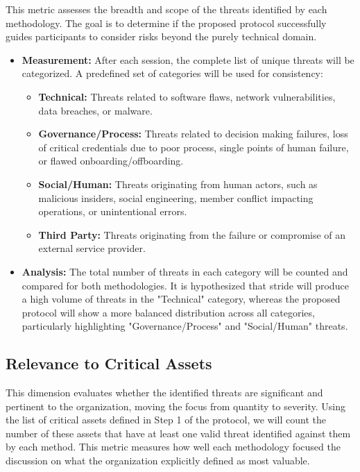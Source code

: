This metric assesses the breadth and scope of the threats identified by each
methodology. The goal is to determine if the proposed protocol successfully
guides participants to consider risks beyond the purely technical domain.

\begin{itemize}
    \item \textbf{Measurement:} After each session, the complete list of unique
    threats will be categorized. A predefined set of categories will be used for
    consistency:

    \begin{itemize}
        \item \textbf{Technical:} Threats related to software flaws, network
        vulnerabilities, data breaches, or malware.

        \item \textbf{Governance/Process:} Threats related to decision making failures,
        loss of critical credentials due to poor process, single points of human
        failure, or flawed onboarding/offboarding.

        \item \textbf{Social/Human:} Threats originating from human actors, such as
        malicious insiders, social engineering, member conflict impacting operations, or
        unintentional errors.

        \item \textbf{Third Party:} Threats originating from the failure or compromise
        of an external service provider.
    \end{itemize}

    \item \textbf{Analysis:} The total number of threats in each category will be
    counted and compared for both methodologies. It is hypothesized that \gls{stride} will
    produce a high volume of threats in the "Technical" category, whereas the
    proposed protocol will show a more balanced distribution across all categories,
    particularly highlighting "Governance/Process" and "Social/Human" threats.
\end{itemize}

\subsection{Relevance to Critical Assets}
\label{subsec:relevance_to_critical_assets}

This dimension evaluates whether the identified threats are significant and
pertinent to the organization, moving the focus from quantity to
severity. Using the list of critical assets defined in Step 1 of the protocol,
we will count the number of these assets that have at least one valid
threat identified against them by each method. This metric measures how well
each methodology focused the discussion on what the organization explicitly
defined as most valuable.

